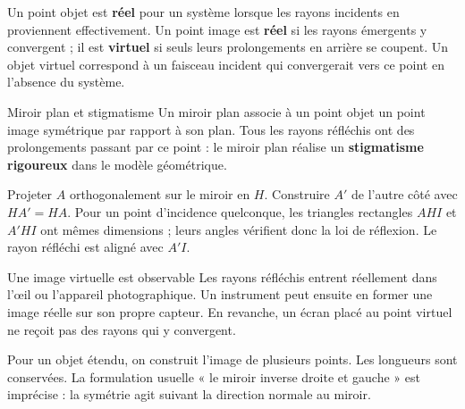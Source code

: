 Un point objet est \textbf{réel} pour un système lorsque les rayons incidents en proviennent effectivement. Un point image est \textbf{réel} si les rayons émergents y convergent ; il est \textbf{virtuel} si seuls leurs prolongements en arrière se coupent. Un objet virtuel correspond à un faisceau incident qui convergerait vers ce point en l'absence du système.
\begin{loi}{Miroir plan et stigmatisme}
Un miroir plan associe à un point objet un point image symétrique par rapport à son plan. Tous les rayons réfléchis ont des prolongements passant par ce point : le miroir plan réalise un \textbf{stigmatisme rigoureux} dans le modèle géométrique.
\end{loi}
Projeter $A$ orthogonalement sur le miroir en $H$. Construire $A'$ de l'autre côté avec $HA'=HA$. Pour un point d'incidence quelconque, les triangles rectangles $AHI$ et $A'HI$ ont mêmes dimensions ; leurs angles vérifient donc la loi de réflexion. Le rayon réfléchi est aligné avec $A'I$.
\begin{piege}{Une image virtuelle est observable}
Les rayons réfléchis entrent réellement dans l'œil ou l'appareil photographique. Un instrument peut ensuite en former une image réelle sur son propre capteur. En revanche, un écran placé au point virtuel ne reçoit pas des rayons qui y convergent.
\end{piege}
Pour un objet étendu, on construit l'image de plusieurs points. Les longueurs sont conservées. La formulation usuelle « le miroir inverse droite et gauche » est imprécise : la symétrie agit suivant la direction normale au miroir.

